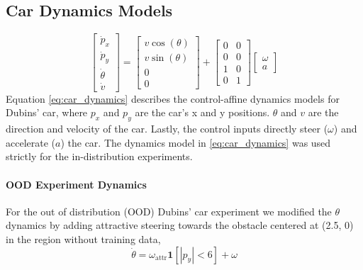 \documentclass{l4dc2026}
\def\1{\bm{1}}
\begin{document}
\subsection{Car Dynamics Models}\label{app:car_dyn}
\begin{equation}\label{eq:car_dynamics}
\begin{bmatrix}
    \dot{p}_x \\
    \dot{p}_y \\
    \dot{\theta} \\
    \dot{v}
\end{bmatrix}
=
\begin{bmatrix}
    v \cos(\theta) \\
    v \sin(\theta) \\
    0 \\
    0
\end{bmatrix}
+
\begin{bmatrix}
    0 & 0 \\
    0 & 0 \\
    1 & 0 \\
    0 & 1
\end{bmatrix}
\begin{bmatrix}
    \omega \\
    a
\end{bmatrix}
\end{equation}
Equation \ref{eq:car_dynamics} describes the control-affine dynamics models for Dubins' car, where $p_x$ and $p_y$ are the car's x and y positions. $\theta$ and $v$ are the direction and velocity of the car. Lastly, the control inputs directly steer ($\omega$) and accelerate ($a$) the car. The dynamics model in  \eqref{eq:car_dynamics} was used strictly for the in-distribution experiments. 

\paragraph{OOD Experiment Dynamics} For the out of distribution (OOD) Dubins' car experiment we modified the $\theta$ dynamics by adding attractive steering towards the obstacle centered at (2.5, 0) in the region without training data,
\begin{equation}\label{eq:theta_mod}
    \dot\theta = \omega_\text{attr}\1[|p_y| < 6] + \omega 
\end{equation}
\end{document}
